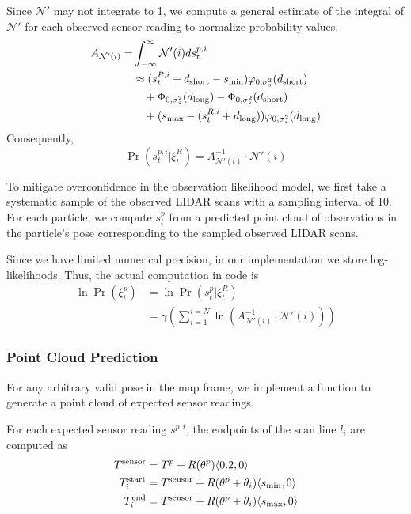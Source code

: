 \documentclass[11pt]{article}
\begin{document}
\noindent
Since $\mathcal{N}'$ may not integrate to 1, we compute a general estimate of
the integral of $\mathcal{N}'$ for each observed sensor reading to normalize
probability values.
\begin{align*}
    && A_{\mathcal{N}'(i)} = & \int_{-\infty}^{\infty} \mathcal{N}'(i) d s^{p,i}_t && \\
    && & \approx (s^{R,i}_t + d_{\textrm{short}} - s_{\textrm{min}}) \varphi_{0, \sigma_s^2}(d_{\textrm{short}}) && \\
    && & \quad + \Phi_{0, \sigma_s^2}(d_{\textrm{long}}) - \Phi_{0, \sigma_s^2}(d_{\textrm{short}}) && \\
    && & \quad + (s_{\textrm{max}} - (s^{R,i}_t + d_{\textrm{long}})) \varphi_{0, \sigma_s^2}(d_{\textrm{long}}) &&
\end{align*}
Consequently,
$$ \Pr(s^{p, i}_t | \xi^{R}_t) = A^{-1}_{\mathcal{N}'(i)} \cdot \mathcal{N}'(i) $$

\noindent
To mitigate overconfidence in the observation likelihood model, we first take a
systematic sample of the observed LIDAR scans with a sampling interval of 10.
For each particle, we compute $s_t^p$ from a predicted point cloud of
observations in the particle's pose corresponding to the sampled observed LIDAR
scans.

\bigskip
\noindent
Since we have limited numerical precision, in our implementation we store log-likelihoods.
Thus, the actual computation in code is
\begin{align*}
    \ln \Pr(\xi^{p}_t) &= \ln \Pr(s^p_t | \xi^{R}_t) \\
    &= \gamma
        \left(
            \sum_{i=1}^{i=N} \ln \left( A^{-1}_{\mathcal{N}'(i)} \cdot \mathcal{N}'(i) \right)
        \right)
\end{align*}

\subsubsection{Point Cloud Prediction}

\def\sensor{\textrm{sensor}}

For any arbitrary valid pose in the map frame, we implement a function to
generate a point cloud of expected sensor readings.

\noindent
For each expected sensor reading $s^{p, i}$, the endpoints of the scan line
$l_i$ are computed as
\begin{align*}
    T^{\sensor} &= T^{p} + R(\theta^p) \langle 0.2, 0 \rangle \\
    T^{\textrm{start}}_i &= T^{\sensor} + R(\theta^p + \theta_i) \langle \smin, 0 \rangle \\
    T^{\textrm{end}}_i &= T^{\sensor} + R(\theta^p + \theta_i) \langle \smax, 0 \rangle \\
\end{align*}
\end{document}
